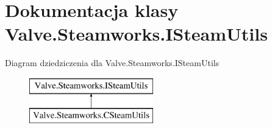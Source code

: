\hypertarget{class_valve_1_1_steamworks_1_1_i_steam_utils}{}\section{Dokumentacja klasy Valve.\+Steamworks.\+I\+Steam\+Utils}
\label{class_valve_1_1_steamworks_1_1_i_steam_utils}
Diagram dziedziczenia dla Valve.\+Steamworks.\+I\+Steam\+Utils\begin{figure}[H]
\begin{center}
\leavevmode
\includegraphics[height=2.000000cm]{class_valve_1_1_steamworks_1_1_i_steam_utils}
\end{center}
\end{figure}
